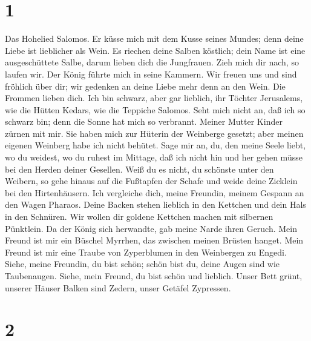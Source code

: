 \hypertarget{section}{%
\section{1}\label{section}}

 Das Hohelied Salomos.  Er küsse mich mit dem
Kusse seines Mundes; denn deine Liebe ist lieblicher als Wein.
 Es riechen deine Salben köstlich; dein Name ist eine
ausgeschüttete Salbe, darum lieben dich die Jungfrauen. 
Zieh mich dir nach, so laufen wir. Der König führte mich in seine
Kammern. Wir freuen uns und sind fröhlich über dir; wir gedenken an
deine Liebe mehr denn an den Wein. Die Frommen lieben dich. 
Ich bin schwarz, aber gar lieblich, ihr Töchter Jerusalems, wie die
Hütten Kedars, wie die Teppiche Salomos.  Seht mich nicht
an, daß ich so schwarz bin; denn die Sonne hat mich so verbrannt. Meiner
Mutter Kinder zürnen mit mir. Sie haben mich zur Hüterin der Weinberge
gesetzt; aber meinen eigenen Weinberg habe ich nicht behütet.
 Sage mir an, du, den meine Seele liebt, wo du weidest, wo
du ruhest im Mittage, daß ich nicht hin und her gehen müsse bei den
Herden deiner Gesellen.  Weiß du es nicht, du schönste unter
den Weibern, so gehe hinaus auf die Fußtapfen der Schafe und weide deine
Zicklein bei den Hirtenhäusern.  Ich vergleiche dich, meine
Freundin, meinem Gespann an den Wagen Pharaos.  Deine
Backen stehen lieblich in den Kettchen und dein Hals in den Schnüren.
 Wir wollen dir goldene Kettchen machen mit silbernen
Pünktlein.  Da der König sich herwandte, gab meine Narde
ihren Geruch.  Mein Freund ist mir ein Büschel Myrrhen, das
zwischen meinen Brüsten hanget.  Mein Freund ist mir eine
Traube von Zyperblumen in den Weinbergen zu Engedi.  Siehe,
meine Freundin, du bist schön; schön bist du, deine Augen sind wie
Taubenaugen.  Siehe, mein Freund, du bist schön und
lieblich. Unser Bett grünt,  unserer Häuser Balken sind
Zedern, unser Getäfel Zypressen.

\hypertarget{section-1}{%
\section{2}\label{section-1}}

